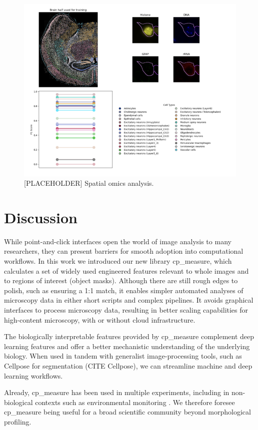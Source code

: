 \documentclass{article}
\begin{document}
\begin{figure}[htbp]
\centering
\includegraphics[width=.9\linewidth]{./figs/spatial.png}
\caption{\label{fig:spatial_omics}{[}PLACEHOLDER] Spatial omics analysis.}
\end{figure}
\section{Discussion}
\label{sec:orgf37b369}
While point-and-click interfaces open the world of image analysis to many researchers, they can present barriers for smooth adoption into computational workflows. In this work we introduced our new library cp\_measure, which calculates a set of widely used engineered features relevant to whole images and to regions of interest (object masks). Although there are still rough edges to polish, such as ensuring a 1:1 match, it enables simpler automated analyses of microscopy data in either short scripts and complex pipelines. It avoids graphical interfaces to process microscopy data, resulting in better scaling capabilities for high-content microscopy, with or without cloud infrastructure.

The biologically interpretable features provided by cp\_measure complement deep learning features and offer a better mechanistic understanding of the underlying biology. When used in tandem with generalist image-processing tools, such as Cellpose for segmentation (CITE Cellpose), we can streamline machine and deep learning workflows. 

Already, cp\_measure  has been used in multiple experiments, including in non-biological contexts such as environmental monitoring \citep{ideharaExploringNileRed2025}. We therefore foresee cp\_measure being useful for a broad scientific community beyond morphological profiling.
\end{document}
